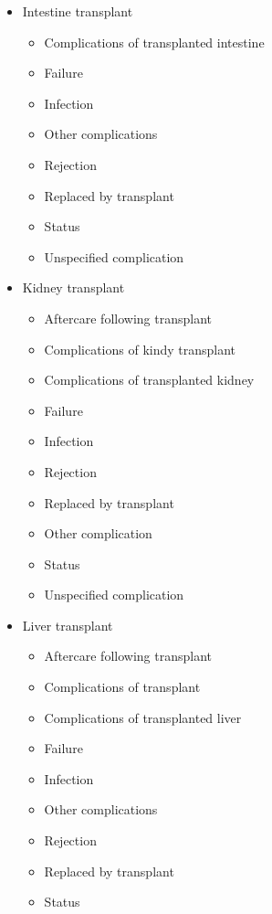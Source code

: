 \begin{itemize}
\begin{itemize}
        \item Intestine transplant
        \begin{itemize}
            \item Complications of transplanted intestine
            \item Failure
            \item Infection
            \item Other complications
            \item Rejection
            \item Replaced by transplant
            \item Status
            \item Unspecified complication
        \end{itemize}
        
        \item Kidney transplant
        \begin{itemize}
            \item Aftercare following transplant
            \item Complications of kindy transplant
            \item Complications of transplanted kidney
            \item Failure
            \item Infection
            \item Rejection
            \item Replaced by transplant
            \item Other complication
            \item Status
            \item Unspecified complication
        \end{itemize}
        
        \item Liver transplant
        \begin{itemize}
            \item Aftercare following transplant
            \item Complications of transplant
            \item Complications of transplanted liver
            \item Failure
            \item Infection
            \item Other complications
            \item Rejection
            \item Replaced by transplant
            \item Status
        \end{itemize}
        

\end{itemize}
\end{itemize}

